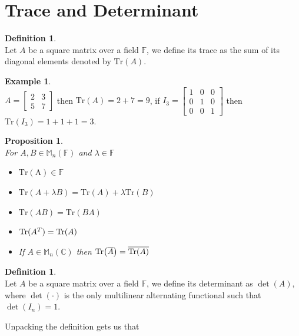 \documentclass[12pt]{article}
\newtheorem{prop}[theorem]{Proposition}
\theoremstyle{definition}
\newtheorem{definition}[theorem]{Definition}
\newtheorem*{example}{Example}
\theoremstyle{remark}
\theoremstyle{plain}
\begin{document}
\section{Trace and Determinant}
\begin{definition}\leavevmode \\
	Let $ A $ be a square matrix over a field $ \mathbb{F} $, we define its trace as the sum of its diagonal elements denoted by $ \mathrm{Tr}(A)$.
\end{definition}
\begin{example}\leavevmode \\
    $A=\begin{bmatrix}
        2 & 3\\
        5 & 7
    \end{bmatrix}$ then $\mathrm{Tr}(A)=2+7=9$, if $I_3=\begin{bmatrix}
        1 & 0 & 0 \\ 0& 1 & 0 \\ 0 & 0 & 1
    \end{bmatrix}$ then $\mathrm{Tr}(I_3)=1+1+1=3$.
\end{example}
\begin{prop}\leavevmode \\ For $A,B \in \mathbb{M}_{n}(\mathbb{F})$ and $\lambda\in\mathbb{F}$
    \begin{itemize}
        \item $ \mathrm{Tr(A)}\in \mathbb{F}$
        \item $\mathrm{Tr}(A+\lambda B)=\mathrm{Tr}(A)+\lambda \mathrm{Tr}(B)$
        \item $ \mathrm{Tr}(AB)=\mathrm{Tr}(BA)$
        \item $ \mathrm{Tr}(A^T)=\Tr(A)$
        \item If $A\in\mathbb{M}_{n}(\mathbb{C})$ then $\Tr(\overline{A})=\overline{\Tr(A)}$
    \end{itemize}
\end{prop}
\begin{definition}\leavevmode \\
	Let $ A $ be a square matrix over a field $ \mathbb{F} $, we define its determinant as $ \det(A) $, where $ \det(\cdot) $ is the only multilinear alternating functional such that $ \det(I_n)=1 $.
\end{definition}
Unpacking the definition gets us that
\end{document}
